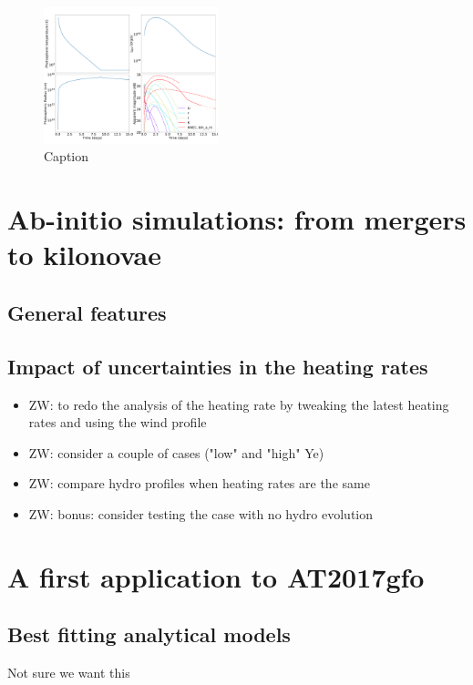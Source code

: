 \documentclass[fleqn,usenatbib]{mnras}
\begin{document}
\begin{figure}
    \centering
    \includegraphics[width=0.45\textwidth]{figures/LC_1comp_wind3_mej-0.01_vej-0.2_kappa_10_KNEC_blh_a_nt.pdf}
    \caption{Caption}
    \label{fig:analytical_comparison}
\end{figure}


\section{Ab-initio simulations: from mergers to kilonovae}
\subsection{General features}
\subsection{Impact of uncertainties in the heating rates}
\begin{itemize}
    \item ZW: to redo the analysis of the heating rate by tweaking the latest heating rates and using the wind profile
    \item ZW: consider a couple of cases ("low" and "high" Ye)
    \item ZW: compare hydro profiles when heating rates are the same
    \item ZW: bonus: consider testing the case with no hydro evolution
\end{itemize}

\section{A first application to AT2017gfo}
\subsection{Best fitting analytical models}
Not sure we want this
\end{document}
